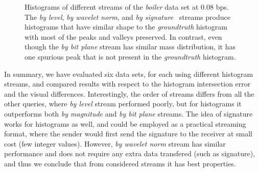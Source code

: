 \begin{figure}[h]
	\centering
	\caption{Histograms of different streams of the \emph{boiler} data set at 0.08 bps. The
        {\em by level}, {\em by wavelet norm}, and {\em by signature}~ streams
        produce histograms that have similar shape to the {\em groundtruth} histogram with most of the peaks and valleys
        preserved. In contrast, even though the {\em by bit plane} stream has similar mass distribution, it has one spurious
        peak that is not present in the {\em groundtruth} histogram.
        }
	\label{fig:histograms-boiler}
\end{figure}

In summary, we have evaluated six data sets, for each using different histogram streams, and
compared results with respect to the histogram intersection error and the visual differences. Interestingly, the
order of streams differs from all the other queries, where {\em by level} stream performed poorly, but for
histograms it outperforms both {\em by magnitude} and {\em by bit plane} streams.
The idea of signature works for histograms as well, and could be employed as a practical streaming
format, where the sender would first send the signature to the receiver at small cost (few integer
values). However, {\em by wavelet norm} stream has similar performance and does not require any extra
data transfered (such as signature), and thus we conclude that from
considered streams it has best properties.



